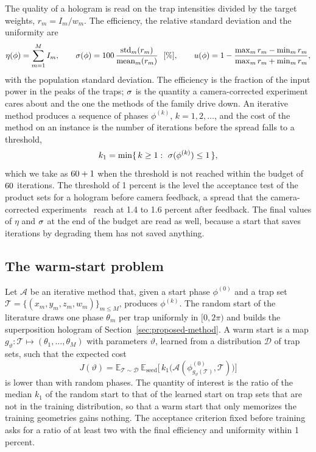 The quality of a hologram is read on the trap intensities divided by the target weights, $r_m=I_m/w_m$. The efficiency, the relative standard deviation and the uniformity are
\begin{equation}
\eta(\phi)=\sum_{m=1}^{M}I_m,\qquad
\sigma(\phi)=100\,\frac{\operatorname{std}_m(r_m)}{\operatorname{mean}_m(r_m)}\ \ [\%],\qquad
u(\phi)=1-\frac{\max_m r_m-\min_m r_m}{\max_m r_m+\min_m r_m},
\label{eq:metrics}
\end{equation}
with the population standard deviation. The efficiency is the fraction of the input power in the peaks of the traps; $\sigma$ is the quantity a camera-corrected experiment cares about and the one the methods of the family drive down. An iterative method produces a sequence of phases $\phi^{(k)}$, $k=1,2,\dots$, and the cost of the method on an instance is
the number of iterations before the spread falls to a threshold,
\begin{equation}
k_1=\min\{\,k\ge1:\ \sigma(\phi^{(k)})\le1\,\},
\label{eq:k1}
\end{equation}
which we take as $60+1$ when the threshold is not reached within the budget of $60$ iterations. The threshold of 1 percent is the level the acceptance test of the product sets for a hologram before camera feedback, a spread that the camera-corrected experiments~\cite{kim2019,nogrette} reach at 1.4 to 1.6 percent after feedback. The final values of $\eta$ and $\sigma$ at the end of the budget
are read as well, because a start that saves iterations by degrading them has not saved anything.

\subsection{The warm-start problem}\label{sec:warm-problem}

Let $\mathcal A$ be an iterative method that, given a start phase $\phi^{(0)}$ and a trap set $\mathcal T=\{(x_m,y_m,z_m,w_m)\}_{m\le M}$, produces $\phi^{(k)}$. The random start of the literature draws one phase $\theta_m$ per trap uniformly in $[0,2\pi)$ and builds the superposition hologram of Section~\ref{sec:proposed-method}. A warm start is a map
$g_\vartheta:\mathcal T\mapsto(\theta_1,\dots,\theta_M)$ with parameters $\vartheta$, learned from a distribution $\mathcal D$ of trap sets, such that the expected cost
\begin{equation}
J(\vartheta)=\mathbb E_{\mathcal T\sim\mathcal D}\ \mathbb E_{\text{seed}}\big[\,k_1\big(\mathcal A(\phi^{(0)}_{g_\vartheta(\mathcal T)},\mathcal T)\big)\big]
\label{eq:warm-objective}
\end{equation}
is lower than with random phases. The quantity of interest is the ratio of the median $k_1$ of the random start to that of the learned start on trap sets that are not in the training distribution, so that a warm start that only
memorizes the training geometries gains nothing. The acceptance criterion fixed before training asks for a ratio of at least two with the final efficiency and uniformity within 1 percent.


